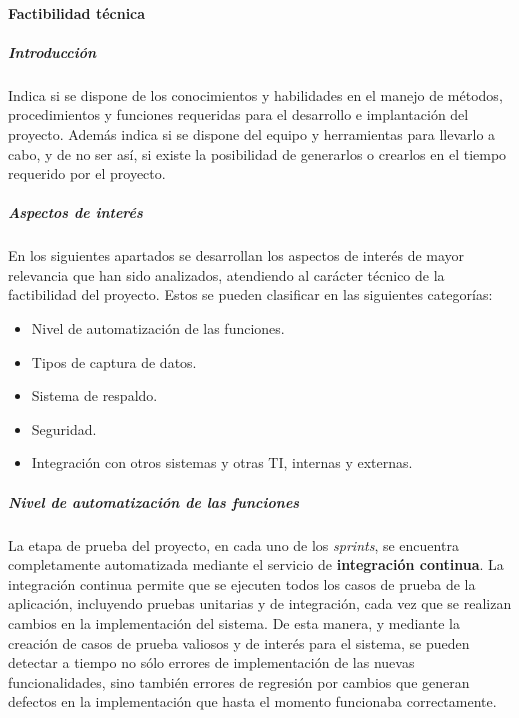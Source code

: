 \paragraph{Factibilidad técnica}

\subparagraph{Introducción}

Indica si se dispone de los conocimientos y habilidades en el manejo de métodos, procedimientos y funciones requeridas para el desarrollo e implantación del proyecto.
Además indica si se dispone del equipo y herramientas para llevarlo a cabo, y de no ser así, si existe la posibilidad de generarlos o crearlos en el tiempo requerido por el proyecto. %

\subparagraph{Aspectos de interés}

En los siguientes apartados se desarrollan los aspectos de interés de mayor relevancia que han sido analizados, atendiendo al carácter técnico de la factibilidad del proyecto.
Estos se pueden clasificar en las siguientes categorías:

\begin{itemize}
    \item Nivel de automatización de las funciones.
    \item Tipos de captura de datos.
    \item Sistema de respaldo.
    \item Seguridad.
    \item Integración con otros sistemas y otras TI, internas y externas.
\end{itemize}



\subparagraph{Nivel de automatización de las funciones}
    
    La etapa de prueba del proyecto, en cada uno de los \textit{sprints}, se encuentra completamente automatizada mediante el servicio de \textbf{integración continua}.
    La integración continua permite que se ejecuten todos los casos de prueba de la aplicación, incluyendo pruebas unitarias y de integración, cada vez que se realizan cambios en la implementación del sistema.
    De esta manera, y mediante la creación de casos de prueba valiosos y de interés para el sistema, se pueden detectar a tiempo no sólo errores de implementación de las nuevas funcionalidades, sino también errores de regresión por cambios que generan defectos en la implementación que hasta el momento funcionaba correctamente.
    
